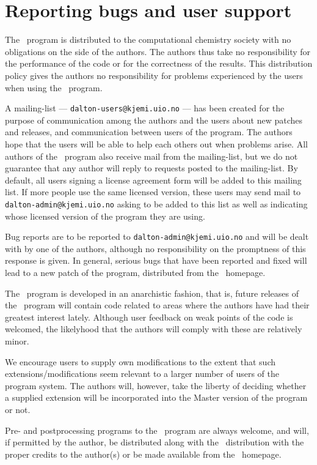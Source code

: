 \section{Reporting bugs and user support}

The \dalton\ program is distributed to the computational chemistry
society with no obligations on the side of the
authors. The authors thus take no responsibility
for the performance
of the code or for the correctness of the
results. This distribution
policy gives the authors no responsibility for problems experienced by
the users when using the \dalton\ program.

A mailing-list ---
\verb|dalton-users@kjemi.uio.no| --- has been created for
the purpose of communication among the authors and the users about
new patches and releases, and communication between users of the
program. The authors hope that the
users will be able to help each others out when problems
arise. All authors of the \dalton\ program also receive mail from the
mailing-list, but we do not guarantee that any author will reply to
requests posted to the mailing-list. By default, all users signing a
license agreement form will be added to this mailing list. If more
people use the same licensed version, these users may send mail to
\verb|dalton-admin@kjemi.uio.no| asking to be added to this list as
well as indicating whose licensed version of the program they are using.

Bug reports are to be reported to \verb|dalton-admin@kjemi.uio.no| and
will be dealt with by one of the authors, although no responsibility
on the promptness of this response is given. In general, serious bugs
that have been
reported and fixed will lead to a new patch of the program, distributed from the
\dalton\ homepage.

The \dalton\ program is developed in an anarchistic fashion, that is,
future releases of the \dalton\ program will contain code related to
areas where the authors have had their greatest interest
lately. Although user feedback on weak points of the code is welcomed, the
likelyhood that the authors will comply with these are relatively
minor.

We encourage users to supply own modifications to
the extent that
such extensions/modifications seem relevant to a larger number of
users of the program system. The authors will, however, take the
liberty of deciding whether a supplied extension will be incorporated
into the Master version of the program or not.

Pre- and postprocessing programs to the \dalton\ program are always
welcome, and will, if permitted by the author, be distributed along
with the \dalton\ distribution with the proper credits to the
author(s) or be made available from the \dalton\ homepage.
